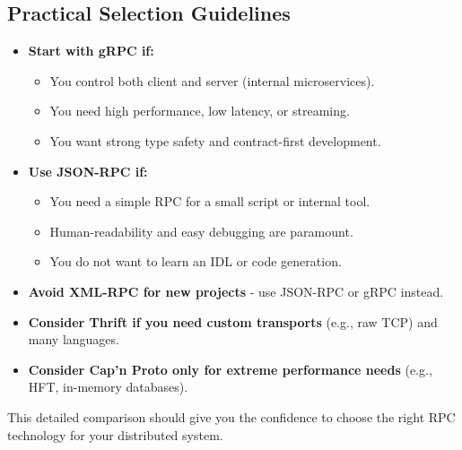 \documentclass[10pt,a4paper]{article}
\begin{document}
\subsection{Practical Selection Guidelines}
\begin{itemize}
    \item \textbf{Start with gRPC if:}
        \begin{itemize}
            \item You control both client and server (internal microservices).
            \item You need high performance, low latency, or streaming.
            \item You want strong type safety and contract-first development.
        \end{itemize}
    \item \textbf{Use JSON-RPC if:}
        \begin{itemize}
            \item You need a simple RPC for a small script or internal tool.
            \item Human-readability and easy debugging are paramount.
            \item You do not want to learn an IDL or code generation.
        \end{itemize}
    \item \textbf{Avoid XML-RPC for new projects} - use JSON-RPC or gRPC instead.
    \item \textbf{Consider Thrift if you need custom transports} (e.g., raw TCP) and many languages.
    \item \textbf{Consider Cap’n Proto only for extreme performance needs} (e.g., HFT, in-memory databases).
\end{itemize}

This detailed comparison should give you the confidence to choose the right RPC technology for your distributed system.
\end{document}

